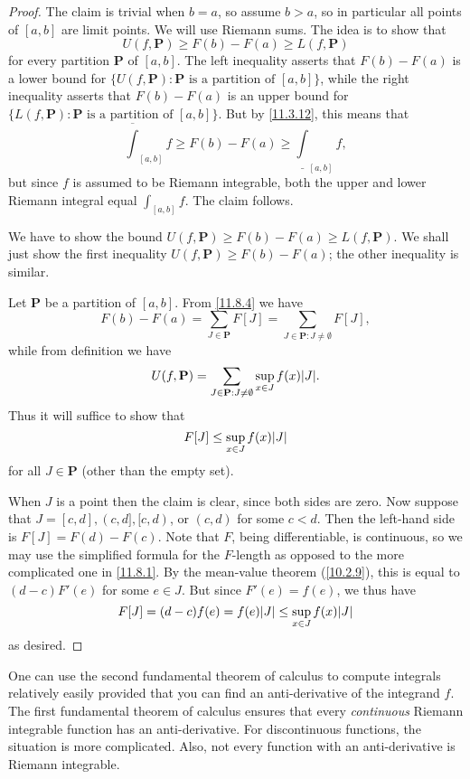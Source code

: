 \begin{proof}
  The claim is trivial when \(b = a\), so assume \(b > a\), so in particular all points of \([a, b]\) are limit points.
  We will use Riemann sums.
  The idea is to show that
  \[
    U(f, \mathbf{P}) \geq F(b) - F(a) \geq L(f, \mathbf{P})
  \]
  for every partition \(\mathbf{P}\) of \([a, b]\).
  The left inequality asserts that \(F(b) - F(a)\) is a lower bound for \(\{U(f, \mathbf{P}) : \mathbf{P} \text{ is a partition of } [a, b]\}\), while the right inequality asserts that \(F(b) - F(a)\) is an upper bound for \(\{L(f, \mathbf{P}) : \mathbf{P} \text{ is a partition of } [a, b]\}\).
  But by \cref{11.3.12}, this means that
  \[
    \overline{\int}_{[a, b]} f \geq F(b) - F(a) \geq \underline{\int}_{[a, b]} f,
  \]
  but since \(f\) is assumed to be Riemann integrable, both the upper and lower Riemann integral equal \(\int_{[a, b]} f\).
  The claim follows.

  We have to show the bound \(U(f, \mathbf{P}) \geq F(b) - F(a) \geq L(f, \mathbf{P})\).
  We shall just show the first inequality \(U(f, \mathbf{P}) \geq F(b) - F(a)\);
  the other inequality is similar.

  Let \(\mathbf{P}\) be a partition of \([a, b]\).
  From \cref{11.8.4} we have
  \[
    F(b) - F(a) = \sum_{J \in \mathbf{P}} F[J] = \sum_{J \in \mathbf{P} : J \neq \emptyset} F[J],
  \]
  while from definition we have
  \[
    U(f, \mathbf{P}) = \sum_{J \in \mathbf{P} : J \neq \emptyset} \sup_{x \in J} f(x) \abs{J}.
  \]
  Thus it will suffice to show that
  \[
    F[J] \leq \sup_{x \in J} f(x) \abs{J}
  \]
  for all \(J \in \mathbf{P}\)
  (other than the empty set).

  When \(J\) is a point then the claim is clear, since both sides are zero.
  Now suppose that \(J = [c, d], (c, d], [c, d)\), or \((c, d)\) for some \(c < d\).
  Then the left-hand side is \(F[J] = F(d) - F(c)\).
  Note that \(F\), being differentiable, is continuous, so we may use the simplified formula for the \(F\)-length as opposed to the more complicated one in \cref{11.8.1}.
  By the mean-value theorem (\cref{10.2.9}), this is equal to \((d - c) F'(e)\) for some \(e \in J\).
  But since \(F'(e) = f(e)\), we thus have
  \[
    F[J] = (d - c) f(e) = f(e) \abs{J} \leq \sup_{x \in J} f(x) \abs{J}
  \]
  as desired.
\end{proof}

\begin{note}
  One can use the second fundamental theorem of calculus to compute integrals relatively easily provided that you can find an anti-derivative of the integrand \(f\).
  The first fundamental theorem of calculus ensures that every \emph{continuous} Riemann integrable function has an anti-derivative.
  For discontinuous functions, the situation is more complicated.
  Also, not every function with an anti-derivative is Riemann integrable.
\end{note}

